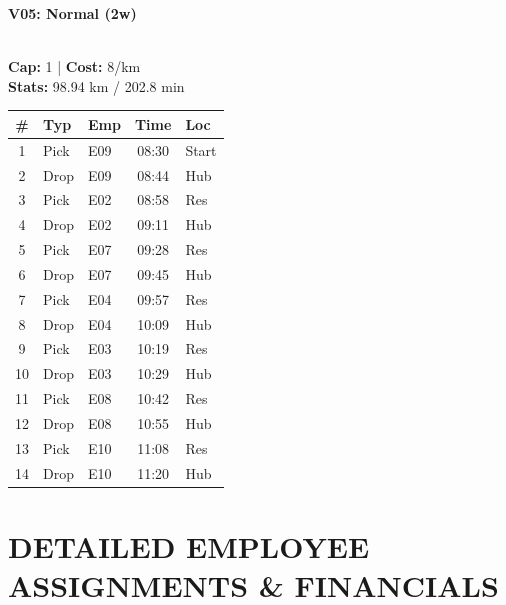 \documentclass[a4paper,11pt]{article}
\begin{document}
\hfill
\begin{minipage}[t]{0.32\textwidth}
    \centering
    \colorbox{velorablue}{\parbox{\dimexpr\linewidth-2\fboxsep}{\centering \color{white}\textbf{V05: Normal (2w)}}} \\
    \vspace{0.05cm}
    {\scriptsize \textbf{Cap:} 1 | \textbf{Cost:} 8/km \\ \textbf{Stats:} 98.94 km / 202.8 min}
    \vspace{-0.1cm}
    
    \renewcommand{\arraystretch}{1.0} %
    \setlength{\tabcolsep}{2pt}
    \scriptsize
    \begin{tabular}{c l l c l}
        \toprule
        \textbf{\#} & \textbf{Typ} & \textbf{Emp} & \textbf{Time} & \textbf{Loc} \\
        \midrule
        1 & Pick & E09 & 08:30 & Start \\
        \rowcolor{headergray} 2 & Drop & E09 & 08:44 & Hub \\
        3 & Pick & E02 & 08:58 & Res \\
        \rowcolor{headergray} 4 & Drop & E02 & 09:11 & Hub \\
        5 & Pick & E07 & 09:28 & Res \\
        \rowcolor{headergray} 6 & Drop & E07 & 09:45 & Hub \\
        7 & Pick & E04 & 09:57 & Res \\
        \rowcolor{headergray} 8 & Drop & E04 & 10:09 & Hub \\
        9 & Pick & E03 & 10:19 & Res \\
        \rowcolor{headergray} 10 & Drop & E03 & 10:29 & Hub \\
        11 & Pick & E08 & 10:42 & Res \\
        \rowcolor{headergray} 12 & Drop & E08 & 10:55 & Hub \\
        13 & Pick & E10 & 11:08 & Res \\
        \rowcolor{headergray} 14 & Drop & E10 & 11:20 & Hub \\
        \bottomrule
    \end{tabular}
\end{minipage}

\vspace{-0.2cm}

\section*{\textcolor{velorablue}{\uppercase{Detailed Employee Assignments \& Financials}}}
\vspace{-0.2cm}
\end{document}
